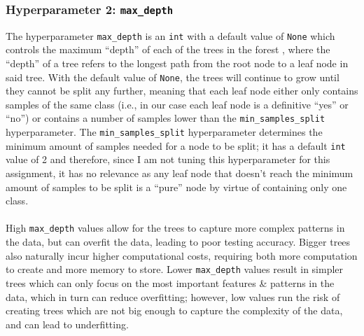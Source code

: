 \documentclass[a4paper, 10pt]{article}
\begin{document}
\subsubsection{Hyperparameter 2: \texttt{max_depth}}
The hyperparameter \texttt{max_depth} is an \texttt{int} with a default value of \texttt{None} which controls the maximum ``depth'' of each of the trees in the forest \supercite{scikit_randomforestclassifier}, where the ``depth'' of a tree refers to the longest path from the root node to a leaf node in said tree.
With the default value of \texttt{None}, the trees will continue to grow until they cannot be split any further, meaning that each leaf node either only contains samples of the same class (i.e., in our case each leaf node is a definitive ``yes'' or ``no'') or contains a number of samples lower than the \texttt{min_samples_split} hyperparameter.
The \texttt{min_samples_split} hyperparameter determines the minimum amount of samples needed for a node to be split; it has a default \texttt{int} value of 2 and therefore, since I am not tuning this hyperparameter for this assignment, it has no relevance as any leaf node that doesn't reach the minimum amount of samples to be split is a ``pure'' node by virtue of containing only one class.
\\\\
High \texttt{max_depth} values allow for the trees to capture more complex patterns in the data, but can overfit the data, leading to poor testing accuracy.
Bigger trees also naturally incur higher computational costs, requiring both more computation to create and more memory to store. 
Lower \texttt{max_depth} values result in simpler trees which can only focus on the most important features \& patterns in the data, which in turn can reduce overfitting;
however, low values run the risk of creating trees which are not big enough to capture the complexity of the data, and can lead to underfitting.
\end{document}
